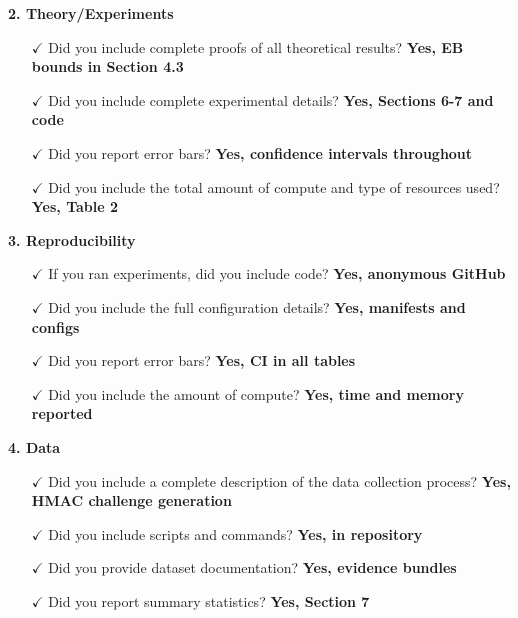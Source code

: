 \documentclass{article}
\begin{document}
\textbf{2. Theory/Experiments}
\begin{itemize}
\item[$\checkmark$] Did you include complete proofs of all theoretical results? \textbf{Yes, EB bounds in Section 4.3}
\item[$\checkmark$] Did you include complete experimental details? \textbf{Yes, Sections 6-7 and code}
\item[$\checkmark$] Did you report error bars? \textbf{Yes, confidence intervals throughout}
\item[$\checkmark$] Did you include the total amount of compute and type of resources used? \textbf{Yes, Table 2}
\end{itemize}

\textbf{3. Reproducibility}
\begin{itemize}
\item[$\checkmark$] If you ran experiments, did you include code? \textbf{Yes, anonymous GitHub}
\item[$\checkmark$] Did you include the full configuration details? \textbf{Yes, manifests and configs}
\item[$\checkmark$] Did you report error bars? \textbf{Yes, CI in all tables}
\item[$\checkmark$] Did you include the amount of compute? \textbf{Yes, time and memory reported}
\end{itemize}

\textbf{4. Data}
\begin{itemize}
\item[$\checkmark$] Did you include a complete description of the data collection process? \textbf{Yes, HMAC challenge generation}
\item[$\checkmark$] Did you include scripts and commands? \textbf{Yes, in repository}
\item[$\checkmark$] Did you provide dataset documentation? \textbf{Yes, evidence bundles}
\item[$\checkmark$] Did you report summary statistics? \textbf{Yes, Section 7}
\end{itemize}
\end{document}
